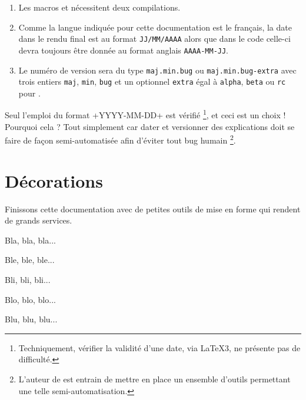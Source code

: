 \documentclass[12pt, a4paper]{article}
\begin{document}
\begin{bdocimportant}
    \leavevmode

    \begin{enumerate}
        \item Les macros  et  nécessitent deux compilations.

        \item Comme la langue indiquée pour cette documentation est le français, la date dans le rendu final est au format \texttt{JJ/MM/AAAA} alors que dans le code celle-ci devra toujours être donnée au format anglais \texttt{AAAA-MM-JJ}.

        \item Le numéro de version sera du type \texttt{maj.min.bug} ou \texttt{maj.min.bug-extra} avec trois entiers \texttt{maj}, \texttt{min}, \texttt{bug} et un optionnel \texttt{extra} égal à \texttt{alpha}, \texttt{beta} ou \texttt{rc} pour .
    \end{enumerate}
\end{bdocimportant}


\begin{bdocwarn}
    Seul l'emploi du format \bdocinlatex+YYYY-MM-DD+ est vérifié
    \footnote{
        Techniquement, vérifier la validité d'une date, via \LaTeX3, ne présente pas de difficulté.
    },
    et ceci est un choix ! Pourquoi cela ? Tout simplement car dater et versionner des explications doit se faire de façon semi-automatisée afin d'éviter tout bug humain
    \footnote{
        L'auteur de  est entrain de mettre en place un ensemble d'outils permettant une telle semi-automatisation.
    }.
\end{bdocwarn}


\section{Décorations}

Finissons cette documentation avec de petites outils de mise en forme qui rendent de grands services.

\begin{bdoclatex}[sbs]
Bla, bla, bla...

\bdocsep %

Ble, ble, ble...

Bli, bli, bli...

\bdocxspace %

Blo, blo, blo...

Blu, blu, blu...

\end{bdoclatex}
\end{document}

